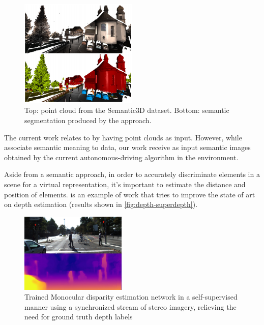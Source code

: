     \begin{figure}[H]
     \caption{\label{fig:semantic-tangent-cnn}
Top: point cloud from the Semantic3D dataset. Bottom: semantic segmentation produced by the approach.}
     \begin{center}
        \includegraphics[width=0.5\textwidth]{images/depth_convul.png}
     \end{center}
    \end{figure}
    
    The current work relates to \cite{semantic_article} by having point clouds as input. However, while \cite{semantic_article} associate semantic meaning to data, our work receive as input semantic images obtained by the current autonomous-driving algorithm in the environment.
    
    Aside from a semantic approach, in order to accurately discriminate elements in a scene for a virtual representation, it's important to estimate the distance and position of elements. \cite{toyota-depth} is an example of work that tries to improve the state of art on depth estimation (results shown in \autoref{fig:depth-superdepth}).

    \begin{figure}[H]
     \caption{\label{fig:depth-superdepth}Trained Monocular
disparity estimation network in a self-supervised manner
using a synchronized stream of stereo imagery, relieving
the need for ground truth depth labels}
     \begin{center}
        \includegraphics[width=0.45\textwidth]{images/superdepth-toyota.PNG}
     \end{center}
    \end{figure}

